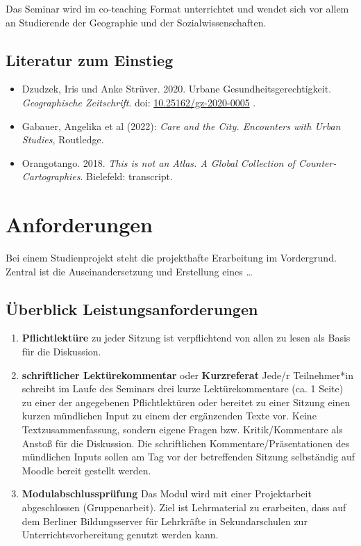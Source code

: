 \documentclass[
  ngerman,
]{article}
\providecommand{\tightlist}{%
  \setlength{\itemsep}{0pt}\setlength{\parskip}{0pt}}
\begin{document}
Das Seminar wird im co-teaching Format unterrichtet und wendet sich vor allem an Studierende der Geographie und der Sozialwissenschaften.

\hypertarget{literatur-zum-einstieg}{%
\subsection*{Literatur zum Einstieg}\label{literatur-zum-einstieg}}

\begin{itemize}
\tightlist
\item
  Dzudzek, Iris und Anke Strüver. 2020. Urbane Gesundheitsgerechtigkeit. \emph{Geographische Zeitschrift}. doi: \href{https://doi.org/10.25162/gz-2020-0005}{10.25162/gz-2020-0005} .
\item
  Gabauer, Angelika et al (2022): \emph{Care and the City. Encounters with Urban Studies}, Routledge.
\item
  Orangotango. 2018. \emph{This is not an Atlas. A Global Collection of Counter-Cartographies}. Bielefeld: transcript.
\end{itemize}

\hypertarget{anforderungen}{%
\section*{Anforderungen}\label{anforderungen}}

Bei einem Studienprojekt steht die projekthafte Erarbeitung im Vordergrund. Zentral ist die Auseinandersetzung und Erstellung eines \ldots{}

\hypertarget{uxfcberblick-leistungsanforderungen}{%
\subsection*{Überblick Leistungsanforderungen}\label{uxfcberblick-leistungsanforderungen}}

\begin{enumerate}
\def\labelenumi{\arabic{enumi}.}
\item
  \textbf{Pflichtlektüre} zu jeder Sitzung ist verpflichtend von allen zu lesen als Basis für die Diskussion.
\item
  \textbf{schriftlicher Lektürekommentar} oder \textbf{Kurzreferat} Jede/r Teilnehmer*in schreibt im Laufe des Seminars drei kurze Lektürekommentare (ca. 1 Seite) zu einer der angegebenen Pflichtlektüren oder bereitet zu einer Sitzung einen kurzen mündlichen Input zu einem der ergänzenden Texte vor. Keine Textzusammenfassung, sondern eigene Fragen bzw. Kritik/Kommentare als Anstoß für die Diskussion. Die schriftlichen Kommentare/Präsentationen des mündlichen Inputs sollen am Tag vor der betreffenden Sitzung selbständig auf Moodle bereit gestellt werden.
\item
  \textbf{Modulabschlussprüfung} Das Modul wird mit einer Projektarbeit abgeschlossen (Gruppenarbeit). Ziel ist Lehrmaterial zu erarbeiten, dass auf dem Berliner Bildungsserver für Lehrkräfte in Sekundarschulen zur Unterrichtsvorbereitung genutzt werden kann.
\end{enumerate}
\end{document}
